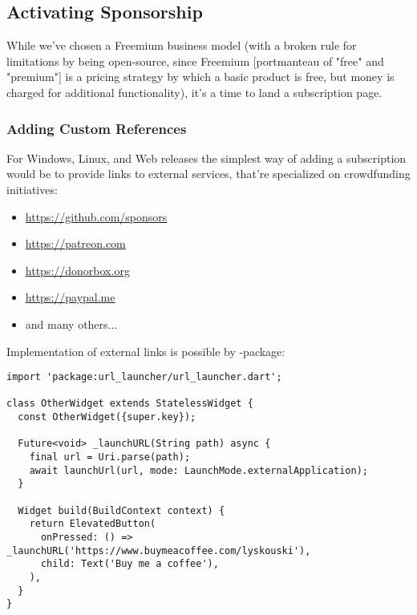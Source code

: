 
\subsection{Activating Sponsorship}

While we've chosen a Freemium business model (with a broken rule for limitations by being open-source, since Freemium 
[portmanteau of "free" and "premium"] is a pricing strategy by which a basic product is free, but money is charged for 
additional functionality), it's a time to land a subscription page.


\subsubsection{Adding Custom References}

For Windows, Linux, and Web releases the simplest way of adding a subscription would be to provide links to external 
services, that're specialized on crowdfunding initiatives:

\begin{itemize}
  \item  \href{https://github.com/sponsors}{https://github.com/sponsors}
  \item  \href{https://patreon.com}{https://patreon.com}
  \item  \href{https://donorbox.org}{https://donorbox.org}
  \item  \href{https://paypal.me}{https://paypal.me}
  \item  and many others...
\end{itemize}

\noindent Implementation of external links is possible by -package:

\begin{lstlisting}
import 'package:url_launcher/url_launcher.dart';

class OtherWidget extends StatelessWidget {
  const OtherWidget({super.key});

  Future<void> _launchURL(String path) async {
    final url = Uri.parse(path);
    await launchUrl(url, mode: LaunchMode.externalApplication);
  }

  Widget build(BuildContext context) {
    return ElevatedButton(
      onPressed: () => _launchURL('https://www.buymeacoffee.com/lyskouski'),
      child: Text('Buy me a coffee'),
    ),
  }
}
\end{lstlisting}


